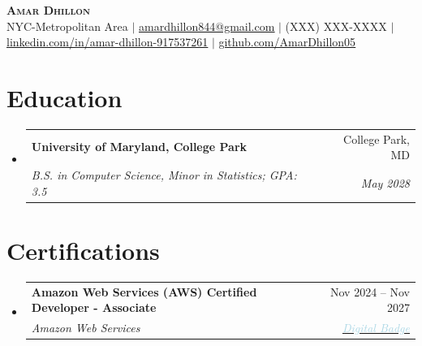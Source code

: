 \documentclass[letterpaper,10pt]{extarticle}
\makeatletter
\newcommand{\resumeSubheading}[4]{%
  \vspace{-2pt}\item
  \begin{tabular*}{0.97\textwidth}[t]{l@{\extracolsep{\fill}}r}
    \textbf{\small#1} & \small#2 \\
    \textit{\small#3} & \textit{\small #4} \\
  \end{tabular*}\vspace{-7pt}%
}
\newcommand{\resumeSubHeadingListStart}{\begin{itemize}[leftmargin=0.15in, label={}]}
\newcommand{\resumeSubHeadingListEnd}{\end{itemize}}
\newcommand{\resumeItemListStart}{\begin{itemize}}
\newcommand{\resumeItemListEnd}{\end{itemize}\vspace{-5pt}}
\makeatother
\begin{document}
\fontsize{8.5pt}{10pt}\selectfont




\begin{center}
    \textcolor{myblue}{\textbf{\fontsize{22}{26}\selectfont \scshape Amar Dhillon}} \\ \vspace{1pt}
    \footnotesize
    NYC-Metropolitan Area $|$
    \href{mailto:amardhillon844@gmail.com}{\underline{amardhillon844@gmail.com}} $|$
    (XXX) XXX-XXXX $|$
    \href{https://linkedin.com/in/amar-dhillon-917537261}{\underline{linkedin.com/in/amar-dhillon-917537261}} $|$
    \href{https://github.com/AmarDhillon05}{\underline{github.com/AmarDhillon05}}
\end{center}


\section{Education}
\vspace{3pt}
  \resumeSubHeadingListStart
    \resumeSubheading
      {University of Maryland, College Park}{College Park, MD}
      {B.S. in Computer Science, Minor in Statistics; GPA: 3.5}{May 2028}
  \resumeSubHeadingListEnd


\section{Certifications}
\vspace{3pt}
\resumeSubHeadingListStart
  \resumeSubheading
    {Amazon Web Services (AWS) Certified Developer - Associate}{Nov 2024 -- Nov 2027}
    {Amazon Web Services}{{\href{https://www.credly.com/badges/d2406a97-d937-47de-823b-724981159d3b/public_url}
{\textcolor{lightblue}{Digital Badge}}}}
\resumeSubHeadingListEnd
\end{document}
